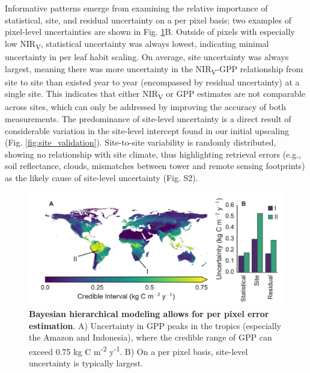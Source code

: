 \documentclass[10pt,letterpaper]{article}
\begin{document}
Informative patterns emerge from examining the relative importance of statistical, site, and residual uncertainty on a per pixel basis; two examples of pixel-level uncertainties are shown in Fig. \ref{fig:uncertainty_map}B. Outside of pixels with especially low NIR\textsubscript{V}, statistical uncertainty was always lowest, indicating minimal uncertainty in per leaf habit scaling.  On average, site uncertainty was always largest, meaning there was more uncertainty in the NIR\textsubscript{V}-GPP relationship from site to site than existed year to year (encompassed by residual uncertainty) at a single site. This indicates that either NIR\textsubscript{V} or GPP estimates are not comparable across sites, which can only be addressed by improving the accuracy of both measurements. The predominance of site-level uncertainty is a direct result of considerable variation in the site-level intercept found in our initial upscaling (Fig. \ref{fig:site_validation}). Site-to-site variability is randomly distributed, showing no relationship with site climate, thus highlighting retrieval errors (e.g., soil reflectance, clouds, mismatches between tower and remote sensing footprints) as the likely cause of site-level uncertainty (Fig. S2).

\begin{figure}[h]
    \centering
    \includegraphics[width=\textwidth, keepaspectratio]{figure_uncertainty_area.pdf}
    \caption{\textbf{Bayesian hierarchical modeling allows for per pixel error estimation}. A) Uncertainty in GPP peaks in the tropics (especially the Amazon and Indonesia), where the credible range of GPP can exceed 0.75 kg C m\textsuperscript{-2} y\textsuperscript{-1}. B) On a per pixel basis, site-level uncertainty is typically largest.}
    \label{fig:uncertainty_map}
\end{figure}
\end{document}
